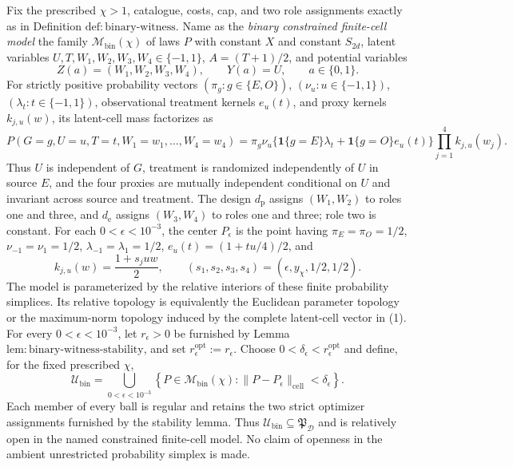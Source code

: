 Fix the prescribed \(\chi>1\), catalogue, costs, cap, and two role assignments exactly as in Definition \(\mathrm{def{:}binary\text{-}witness}\). Name as the \emph{binary constrained finite-cell model} the family \(\mathcal M_{\mathrm{bin}}(\chi)\) of laws \(P\) with constant \(X\) and constant \(S_{2d}\), latent variables \(U,T,W_1,W_2,W_3,W_4\in\{-1,1\}\), \(A=(T+1)/2\), and potential variables
\[
 Z(a)=(W_1,W_2,W_3,W_4),\qquad Y(a)=U,
 \qquad a\in\{0,1\}.
\]
For strictly positive probability vectors \((\pi_g:g\in\{E,O\})\), \((\nu_u:u\in\{-1,1\})\), \((\lambda_t:t\in\{-1,1\})\), observational treatment kernels \(e_u(t)\), and proxy kernels \(k_{j,u}(w)\), its latent-cell mass factorizes as
\[
 P(G=g,U=u,T=t,W_1=w_1,\ldots,W_4=w_4)
 =\pi_g\nu_u\bigl\{\mathbf 1\{g=E\}\lambda_t
 +\mathbf 1\{g=O\}e_u(t)\bigr\}
 \prod_{j=1}^4k_{j,u}(w_j). \tag{1}
\]
Thus \(U\) is independent of \(G\), treatment is randomized independently of \(U\) in source \(E\), and the four proxies are mutually independent conditional on \(U\) and invariant across source and treatment. The design \(d_{\mathrm p}\) assigns \((W_1,W_2)\) to roles one and three, and \(d_{\mathrm e}\) assigns \((W_3,W_4)\) to roles one and three; role two is constant. For each \(0<\epsilon<10^{-3}\), the center \(P_\epsilon\) is the point having \(\pi_E=\pi_O=1/2\), \(\nu_{-1}=\nu_1=1/2\), \(\lambda_{-1}=\lambda_1=1/2\), \(e_u(t)=(1+tu/4)/2\), and
\[
 k_{j,u}(w)=\frac{1+s_juw}{2},
 \qquad
 (s_1,s_2,s_3,s_4)=(\epsilon,y_{\chi},1/2,1/2).
\]
The model is parameterized by the relative interiors of these finite probability simplices. Its relative topology is equivalently the Euclidean parameter topology or the maximum-norm topology induced by the complete latent-cell vector in (1). For every \(0<\epsilon<10^{-3}\), let \(r_\epsilon>0\) be furnished by Lemma \(\mathrm{lem{:}binary\text{-}witness\text{-}stability}\), and set \(r_\epsilon^{\mathrm{opt}}:=r_\epsilon\). Choose \(0<\delta_\epsilon<r_\epsilon^{\mathrm{opt}}\) and define, for the fixed prescribed \(\chi\),
\[
 \mathcal U_{\mathrm{bin}}
 =\bigcup_{0<\epsilon<10^{-3}}
 \left\{P\in\mathcal M_{\mathrm{bin}}(\chi):
 \|P-P_\epsilon\|_{\mathrm{cell}}<\delta_\epsilon\right\}. \tag{2}
\]
Each member of every ball is regular and retains the two strict optimizer assignments furnished by the stability lemma. Thus \(\mathcal U_{\mathrm{bin}}\subseteq\mathfrak P_{\mathcal D}\) and is relatively open in the named constrained finite-cell model. No claim of openness in the ambient unrestricted probability simplex is made.